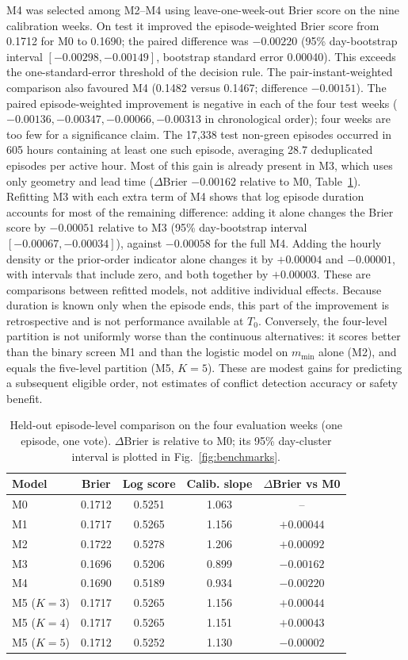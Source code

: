 \documentclass[pdflatex,sn-mathphys-num]{sn-jnl}
\newcommand{\mmin}{m_{\min}}
\begin{document}
M4 was selected among M2--M4 using leave-one-week-out Brier score on the nine calibration weeks. On test it improved the episode-weighted Brier score from 0.1712 for M0 to 0.1690; the paired difference was $-0.00220$ (95\% day-bootstrap interval $[-0.00298,-0.00149]$, bootstrap standard error 0.00040). This exceeds the one-standard-error threshold of the decision rule. The pair-instant-weighted comparison also favoured M4 (0.1482 versus 0.1467; difference $-0.00151$). The paired episode-weighted improvement is negative in each of the four test weeks ($-0.00136,-0.00347,-0.00066,-0.00313$ in chronological order); four weeks are too few for a significance claim. The 17,338 test non-green episodes occurred in 605 hours containing at least one such episode, averaging 28.7 deduplicated episodes per active hour. Most of this gain is already present in M3, which uses only geometry and lead time ($\Delta$Brier $-0.00162$ relative to M0, Table~\ref{tab:bench}). Refitting M3 with each extra term of M4 shows that log episode duration accounts for most of the remaining difference: adding it alone changes the Brier score by $-0.00051$ relative to M3 (95\% day-bootstrap interval $[-0.00067,-0.00034]$), against $-0.00058$ for the full M4. Adding the hourly density or the prior-order indicator alone changes it by $+0.00004$ and $-0.00001$, with intervals that include zero, and both together by $+0.00003$. These are comparisons between refitted models, not additive individual effects. Because duration is known only when the episode ends, this part of the improvement is retrospective and is not performance available at $T_0$. Conversely, the four-level partition is not uniformly worse than the continuous alternatives: it scores better than the binary screen M1 and than the logistic model on $\mmin$ alone (M2), and equals the five-level partition (M5, $K=5$). These are modest gains for predicting a subsequent eligible order, not estimates of conflict detection accuracy or safety benefit.

\begin{table}[t]
\caption{Held-out episode-level comparison on the four evaluation weeks (one episode, one vote). $\Delta$Brier is relative to M0; its 95\% day-cluster interval is plotted in Fig.~\ref{fig:benchmarks}.}\label{tab:bench}
\begin{tabular}{@{}lcccc@{}}
\toprule
Model & Brier & Log score & Calib. slope & $\Delta$Brier vs M0\\
\midrule
M0 & 0.1712 & 0.5251 & 1.063 & --\\
M1 & 0.1717 & 0.5265 & 1.156 & $+0.00044$\\
M2 & 0.1722 & 0.5278 & 1.206 & $+0.00092$\\
M3 & 0.1696 & 0.5206 & 0.899 & $-0.00162$\\
M4 & 0.1690 & 0.5189 & 0.934 & $-0.00220$\\
M5 ($K=3$) & 0.1717 & 0.5265 & 1.156 & $+0.00044$\\
M5 ($K=4$) & 0.1717 & 0.5265 & 1.151 & $+0.00043$\\
M5 ($K=5$) & 0.1712 & 0.5252 & 1.130 & $-0.00002$\\
\bottomrule
\end{tabular}
\end{table}
\end{document}
